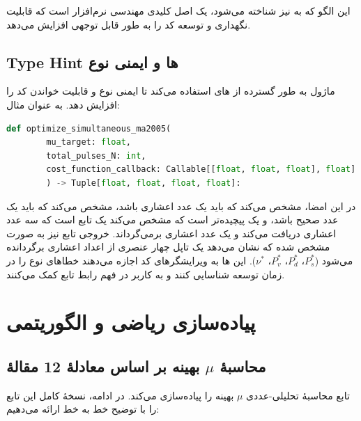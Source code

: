 این الگو که به  نیز شناخته می‌شود، یک اصل کلیدی مهندسی نرم‌افزار است که قابلیت نگهداری و توسعه کد را به طور قابل توجهی افزایش می‌دهد.

\subsection{Type Hint ها و ایمنی نوع}

ماژول به طور گسترده از  های  استفاده می‌کند تا ایمنی نوع و قابلیت خواندن کد را افزایش دهد. به عنوان مثال:

\begin{LTR}
	\begin{lstlisting}[language=Python]
		def optimize_simultaneous_ma2005(
		mu_target: float,
		total_pulses_N: int,
		cost_function_callback: Callable[[float, float, float], float]
		) -> Tuple[float, float, float, float]:
	\end{lstlisting}
\end{LTR}

در این امضا،  مشخص می‌کند که  باید یک عدد اعشاری باشد،  مشخص می‌کند که  باید یک عدد صحیح باشد، و  یک  پیچیده‌تر است که مشخص می‌کند  یک تابع است که سه عدد اعشاری دریافت می‌کند و یک عدد اعشاری برمی‌گرداند. خروجی تابع نیز به صورت  مشخص شده که نشان می‌دهد یک تاپل چهار عنصری از اعداد اعشاری برگردانده می‌شود ($P_s^*$، $P_d^*$، $P_v^*$، $\nu^*$). این  ها به ویرایشگرهای کد اجازه می‌دهند خطاهای نوع را در زمان توسعه شناسایی کنند و به کاربر در فهم رابط تابع کمک می‌کنند.

\section{پیاده‌سازی ریاضی و الگوریتمی}

\subsection{محاسبۀ $\mu$ بهینه بر اساس معادلۀ 12 مقالۀ }

تابع  محاسبۀ تحلیلی-عددی $\mu$ بهینه را پیاده‌سازی می‌کند. در ادامه، نسخۀ کامل این تابع را با توضیح خط به خط ارائه می‌دهیم:

